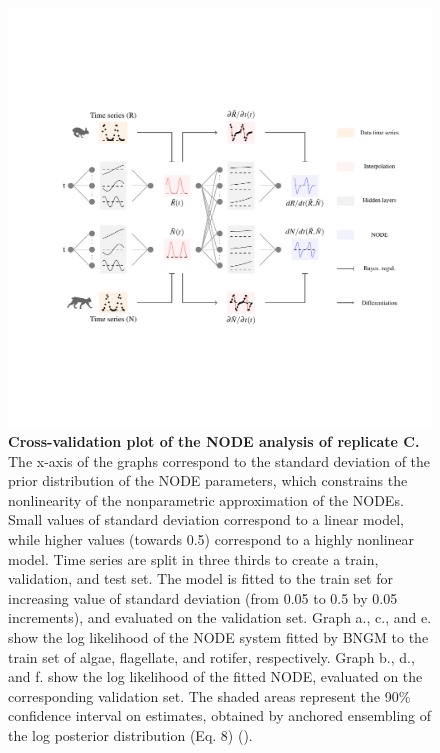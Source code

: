 \documentclass[11pt, oneside]{article}
\begin{document}
\newpage
\begin{figure}[H]
\includegraphics[width=1\linewidth,page=21]{figures/main.pdf}
\caption{
    \textbf{Cross-validation plot of the NODE analysis of replicate C.}
    The x-axis of the graphs correspond to the standard deviation of the prior distribution of the NODE parameters, which constrains the nonlinearity of the nonparametric approximation of the NODEs.
    Small values of standard deviation correspond to a linear model, while higher values (towards 0.5) correspond to a highly nonlinear model.
    Time series are split in three thirds to create a train, validation, and test set. 
    The model is fitted to the train set for increasing value of standard deviation (from 0.05 to 0.5 by 0.05 increments), and evaluated on the validation set.
    Graph a., c., and e. show the log likelihood of the NODE system fitted by BNGM to the train set of algae, flagellate, and rotifer, respectively.
    Graph b., d., and f. show the log likelihood of the fitted NODE, evaluated on the corresponding validation set.
    The shaded areas represent the 90\% confidence interval on estimates, obtained by anchored ensembling of the log posterior distribution (Eq. 8) (\cite{Pearce2018}).
}
\end{figure}
\newpage
\end{document}
